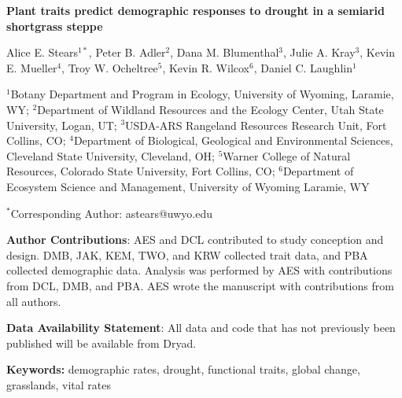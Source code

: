 \documentclass[12pt, letterpaper]{article}
\begin{document}
\begin{flushleft}
\Large{\textbf{Plant traits predict demographic responses to drought in a semiarid shortgrass steppe}} 

\normalsize{Alice E. Stears$^{1*}$, Peter B. Adler$^2$, Dana M. Blumenthal$^3$, Julie A. Kray$^3$, Kevin E. Mueller$^4$, Troy W. Ocheltree$^5$, Kevin R. Wilcox$^6$, Daniel C. Laughlin$^1$}

\small{$^1$Botany Department and Program in Ecology, University of Wyoming, Laramie, WY; \linebreak
$^2$Department of Wildland Resources and the Ecology Center, Utah State University, Logan, UT; \linebreak
$^3$USDA-ARS Rangeland Resources Research Unit, Fort Collins, CO; \linebreak
$^4$Department of Biological, Geological and Environmental Sciences, Cleveland State University, Cleveland, OH; \linebreak
$^5$Warner College of Natural Resources, Colorado State University, Fort Collins, CO; \linebreak
$^6$Department of Ecosystem Science and Management, University of Wyoming Laramie, WY}\linebreak

\small{$^*$Corresponding Author: astears@uwyo.edu}

\small{
\textbf{Author Contributions}: AES and DCL contributed to study conception and design. DMB, JAK, KEM, TWO, and KRW collected trait data, and PBA collected demographic data. Analysis was performed by AES with contributions from DCL, DMB, and PBA. AES wrote the manuscript with contributions from all authors. 
} 

\small{\textbf{Data Availability Statement}: All data and code that has not previously been published will be available from Dryad. }

\end{flushleft}
\textbf{Keywords:} demographic rates, drought, functional traits, global change, grasslands, vital rates
\end{document}
